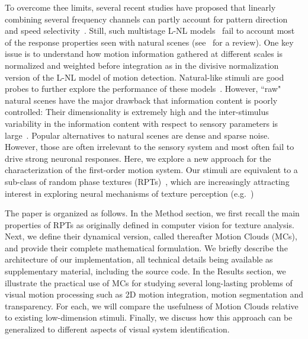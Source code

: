 \documentclass[a4paper,11pt]{article}%
\begin{document}
To overcome thee limits, several recent studies have proposed that linearly combining several frequency channels can partly account for pattern direction and speed selectivity~\citep{Rust05b,Rust06,Nishimoto11}. Still, such multistage L-NL models~\citep{Heeger96,Simoncelli98} fail to account most of the response properties seen with natural scenes (see~\citep{Carandini05} for a review). One key issue is to understand how motion information gathered at different scales is normalized and weighted before integration as in the divisive normalization version of the L-NL model of motion detection. Natural-like stimuli are good probes to further explore the performance of these models~\citep{Schwartz01}. However, ``raw" natural scenes have the major drawback that information content is poorly controlled: Their dimensionality is extremely high and the inter-stimulus variability in the information content with respect to sensory parameters is large~\citep{Rust05}. Popular alternatives to natural scenes are dense and sparse noise. However, those are often irrelevant to the sensory system and most often fail to drive strong neuronal responses.  Here, we explore a new approach for the characterization of the first-order motion system. Our stimuli are  equivalent to a sub-class of random phase textures (RPTs)~\citep{Galerne10}, which are increasingly attracting interest in exploring neural mechanisms of texture perception (e.g.~\citep{Solomon10})

The paper is organized as follows. In the Method section, we first recall the main properties of  RPTs as originally defined in computer vision for texture analysis. Next, we define their dynamical version, called thereafter Motion Clouds (MCs), and provide their complete mathematical formulation. We briefly describe the architecture of our implementation, all technical details being available as supplementary material, including the source code. In the Results section, we illustrate the practical use of MCs for studying several long-lasting problems of visual motion processing such as 2D motion integration, motion segmentation and transparency. For each, we will compare the usefulness of Motion Clouds relative to existing low-dimension stimuli. Finally, we discuss how this approach can be generalized to different aspects of visual system identification. %
\end{document}
